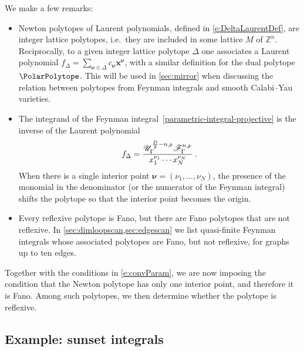 \documentclass[12pt,a4paper]{article}
\theoremstyle{plain}
\theoremstyle{remark}
\newcommand{\nprops}{N}
\newcommand{\cU}{\mathscr {U}}
\newcommand{\cF}{\mathscr {F}}
\newcommand{\undernotation}[1]{\pmb{#1}}
\newcommand{\Newton}{\Delta}
\begin{document}
	We make a few remarks:
        \begin{itemize}
          \item 	Newton polytopes of Laurent polynomials, defined in \cref{e:DeltaLaurentDef}, are integer lattice polytopes, i.e.\ they are included in
		some lattice $M$ of $\mathbb Z^n$. 
	Reciprocally, to a given integer lattice 
		polytope $\Delta$ one associates a Laurent polynomial
		$ f_{\Delta}=\sum_{\undernotation{\nu}\in\Delta} c_{\undernotation{\nu}} \undernotation
		x^{\undernotation{\nu}}$, with a similar definition for the dual polytope $\PolarPolytope$. This will be used in \cref{sec:mirror} when discussing the relation between polytopes from Feynman integrals and smooth Calabi--Yau varieties.

					\item The integrand of the
                                          Feynman integral~\eqref{parametric-integral-projective} is the inverse of the
			Laurent polynomial
			\begin{equation}
				f_\Newton=\frac{ 
					\cU_\Gamma^{{D\over2}-n_\cF} \cF_\Gamma^{n_\cF}} {x_1^{\nu_1}\cdots x_\nprops^{\nu_\nprops}} \, .
			\end{equation}
			When there is a single interior point $\undernotation{\nu}=(\nu_1,\dots,\nu_\nprops)$, the
			presence of the monomial in the denominator
                        (or the numerator of the Feynman integral) shifts the polytope so
			that the interior point becomes the origin.
            \item 
			Every reflexive polytope is Fano, but there are Fano polytopes that are
			not reflexive. In \cref{sec:dimloopscan,sec:edgescan} we list quasi-finite Feynman integrals whose associated polytopes are Fano, but not reflexive, for graphs up to ten edges. 
			
		\end{itemize}
		
		
		Together with the conditions in \cref{e:convParam}, we are now imposing the condition that the Newton polytope has only one interior point, and therefore it is Fano. 
        Among such polytopes, we then determine whether the polytope is reflexive.

                
		\subsection{Example: sunset integrals}\label{sec:sunset}
\end{document}
